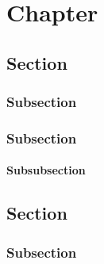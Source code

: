 \chapter{Chapter}
\section{Section}
\subsection{Subsection}
\lipsum[1-8]
\subsection{Subsection}
\subsubsection{Subsubsection}
\lipsum[9-10]
\section{Section}
\subsection{Subsection}
\lipsum[11-12]
